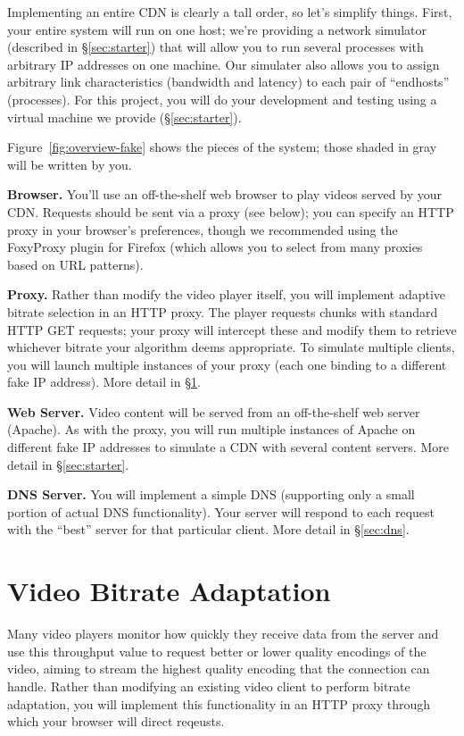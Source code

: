 \documentclass{article}
\begin{document}
Implementing an entire CDN is clearly a tall order, so let's simplify things.
First, your entire system will run on one host; we're providing a network
simulator (described in \S\ref{sec:starter}) that will allow you to run several
processes with arbitrary IP addresses on one machine. Our simulater also allows
you to assign arbitrary link characteristics (bandwidth and latency) to each
pair of ``endhosts'' (processes). For this project, you will do your
development and testing using a virtual machine we provide
(\S\ref{sec:starter}).

Figure~\ref{fig:overview-fake} shows the pieces of the system; those shaded in
gray will be written by you.

\medskip\noindent \textbf{Browser.} You'll use an off-the-shelf web browser to play
videos served by your CDN. Requests should be sent via a proxy (see below); you
can specify an HTTP proxy in your browser's preferences, though we recommended
using the FoxyProxy plugin for Firefox (which allows you to select from many
proxies based on URL patterns).

\medskip \noindent \textbf{Proxy.} Rather than modify the video player itself, you will
implement adaptive bitrate selection in an HTTP proxy. The player requests
chunks with standard HTTP GET requests; your proxy will intercept these and
modify them to retrieve whichever bitrate your algorithm deems appropriate. To
simulate multiple clients, you will launch multiple instances of your proxy
(each one binding to a different fake IP address). More detail in
\S\ref{sec:proxy}.

\medskip \noindent \textbf{Web Server.} Video content will be served from an
off-the-shelf web server (Apache). As with the proxy, you will run multiple
instances of Apache on different fake IP addresses to simulate a CDN with
several content servers. More detail in \S\ref{sec:starter}.

\medskip \noindent \textbf{DNS Server.} You will implement a simple DNS (supporting only
a small portion of actual DNS functionality). Your server will respond to each
request with the ``best'' server for that particular client. More detail in
\S\ref{sec:dns}.




\section{Video Bitrate Adaptation}
\label{sec:proxy}

Many video players monitor how quickly they receive data from the server and
use this throughput value to request better or lower quality encodings of the
video, aiming to stream the highest quality encoding that the connection can
handle. Rather than modifying an existing video client to perform bitrate
adaptation, you will implement this functionality in an HTTP proxy through
which your browser will direct reqeusts.
\end{document}
